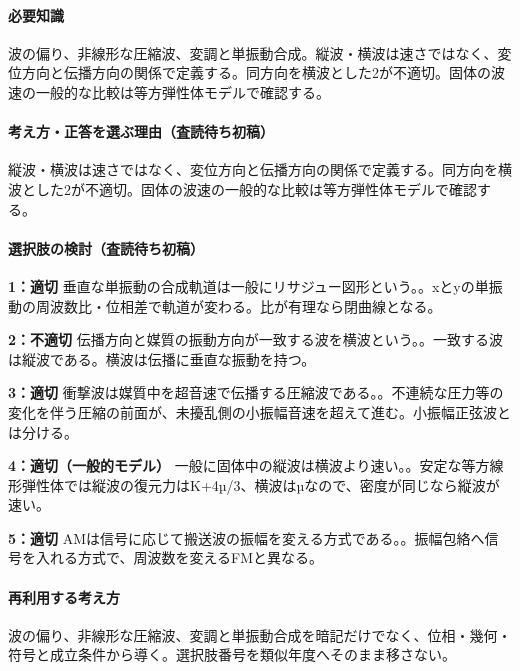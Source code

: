 \paragraph{必要知識} 波の偏り、非線形な圧縮波、変調と単振動合成。縦波・横波は速さではなく、変位方向と伝播方向の関係で定義する。同方向を横波とした2が不適切。固体の波速の一般的な比較は等方弾性体モデルで確認する。

\paragraph{考え方・正答を選ぶ理由（査読待ち初稿）} 縦波・横波は速さではなく、変位方向と伝播方向の関係で定義する。同方向を横波とした2が不適切。固体の波速の一般的な比較は等方弾性体モデルで確認する。

\paragraph{選択肢の検討（査読待ち初稿）}\mbox{}\par

\noindent\textbf{1：適切} 垂直な単振動の合成軌道は一般にリサジュー図形という。。xとyの単振動の周波数比・位相差で軌道が変わる。比が有理なら閉曲線となる。\par

\noindent\textbf{2：不適切} 伝播方向と媒質の振動方向が一致する波を横波という。。一致する波は縦波である。横波は伝播に垂直な振動を持つ。\par

\noindent\textbf{3：適切} 衝撃波は媒質中を超音速で伝播する圧縮波である。。不連続な圧力等の変化を伴う圧縮の前面が、未擾乱側の小振幅音速を超えて進む。小振幅正弦波とは分ける。\par

\noindent\textbf{4：適切（一般的モデル）} 一般に固体中の縦波は横波より速い。。安定な等方線形弾性体では縦波の復元力はK+4µ/3、横波はµなので、密度が同じなら縦波が速い。\par

\noindent\textbf{5：適切} AMは信号に応じて搬送波の振幅を変える方式である。。振幅包絡へ信号を入れる方式で、周波数を変えるFMと異なる。\par

\paragraph{再利用する考え方} 波の偏り、非線形な圧縮波、変調と単振動合成を暗記だけでなく、位相・幾何・符号と成立条件から導く。選択肢番号を類似年度へそのまま移さない。

